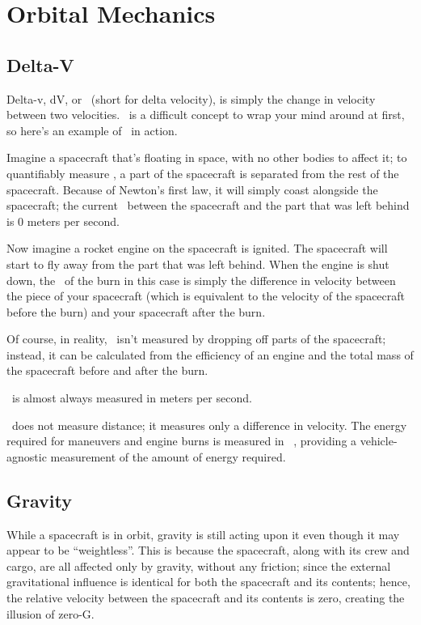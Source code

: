 
\chapter{Orbital Mechanics}

\section{Delta-V}
\label{sec:dv}

Delta-v, dV, or \dv\ (short for delta velocity), is simply the change
in velocity between two velocities. \dv\ is a difficult concept to wrap
your mind around at first, so here's an example of \dv\ in action.

Imagine a spacecraft that's floating in space, with no other bodies to
affect it; to quantifiably measure \dv, a part of the spacecraft is
separated from the rest of the spacecraft. Because of Newton's first
law, it will simply coast alongside the spacecraft; the current
\dv\ between the spacecraft and the part that was left behind is 0
meters per second.

Now imagine a rocket engine on the spacecraft is ignited. The
spacecraft will start to fly away from the part that was left
behind. When the engine is shut down, the \dv\ of the burn in this
case is simply the difference in velocity between the piece of your
spacecraft (which is equivalent to the velocity of the spacecraft
before the burn) and your spacecraft after the burn.

Of course, in reality, \dv\ isn't measured by dropping off parts of
the spacecraft; instead, it can be calculated from the efficiency of
an engine and the total mass of the spacecraft before and after the
burn.

\dv\ is almost always measured in meters per second.


\dv\ does not measure distance; it measures only a difference in
velocity. The energy required for maneuvers and engine burns is
measured in \dv\ , providing a vehicle-agnostic measurement of the amount
of energy required.

\section{Gravity}

While a spacecraft is in orbit, gravity is still acting upon it even
though it may appear to be ``weightless''. This is because the
spacecraft, along with its crew and cargo, are all affected only by
gravity, without any friction; since the external gravitational
influence is identical for both the spacecraft and its contents;
hence, the relative velocity between the spacecraft and its contents
is zero, creating the illusion of zero-G.

